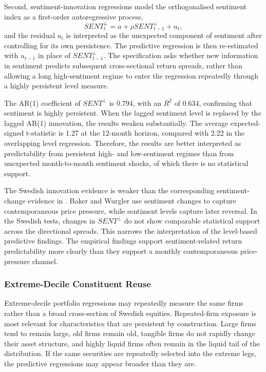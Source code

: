 \documentclass[11pt]{article}
\newcommand{\var}[1]{\ensuremath{#1}}
\begin{document}
Second, sentiment-innovation regressions model the orthogonalised sentiment index as a first-order autoregressive process,
\begin{equation}
    SENT^{\perp}_{t} = a + \rho SENT^{\perp}_{t-1} + u_t,
\end{equation}
and the residual \var{u_t} is interpreted as the unexpected component of sentiment after controlling for its own persistence. The predictive regression is then re-estimated with \var{u_{t-1}} in place of \var{SENT^{\perp}_{t-1}}. The specification asks whether new information in sentiment predicts subsequent cross-sectional return spreads, rather than allowing a long high-sentiment regime to enter the regression repeatedly through a highly persistent level measure.

The AR(1) coefficient of \var{SENT^{\perp}} is 0.794, with an \var{R^2} of 0.634, confirming that sentiment is highly persistent. When the lagged sentiment level is replaced by the lagged AR(1) innovation, the results weaken substantially. The average expected-signed t-statistic is 1.27 at the 12-month horizon, compared with 2.22 in the overlapping level regression. Therefore, the results are better interpreted as predictability from persistent high- and low-sentiment regimes than from unexpected month-to-month sentiment shocks, of which there is no statistical support.

The Swedish innovation evidence is weaker than the corresponding sentiment-change evidence in \citet{baker2007}. Baker and Wurgler use sentiment changes to capture contemporaneous price pressure, while sentiment levels capture later reversal. In the Swedish tests, changes in \var{SENT^{\perp}} do not show comparable statistical support across the directional spreads. This narrows the interpretation of the level-based predictive findings. The empirical findings support sentiment-related return predictability more clearly than they support a monthly contemporaneous price-pressure channel.

\subsubsection{Extreme-Decile Constituent Reuse}
Extreme-decile portfolio regressions may repeatedly measure the same firms rather than a broad cross-section of Swedish equities. Repeated-firm exposure is most relevant for characteristics that are persistent by construction. Large firms tend to remain large, old firms remain old, tangible firms do not rapidly change their asset structure, and highly liquid firms often remain in the liquid tail of the distribution. If the same securities are repeatedly selected into the extreme legs, the predictive regressions may appear broader than they are.
\end{document}
